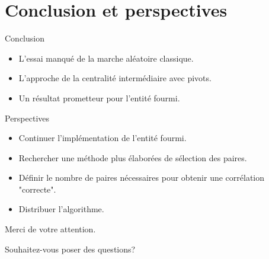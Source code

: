 \documentclass{beamer}
\begin{document}
\section{Conclusion et perspectives}

\begin{frame}
	\begin{block}{Conclusion}
		\begin{itemize}
		    \item L'essai manqué de la marche aléatoire classique.
		    \item L'approche de la centralité intermédiaire avec pivots.
		    \item Un résultat prometteur pour l'entité fourmi.
		\end{itemize}
	\end{block}
\end{frame}

\begin{frame}
	\begin{block}{Perspectives}
		\begin{itemize}
		    \item Continuer l'implémentation de l'entité fourmi.
		    \item Rechercher une méthode plus élaborées de sélection des paires.
		    \item Définir le nombre de paires nécessaires pour obtenir une corrélation "correcte".
		    \item Distribuer l'algorithme.
		\end{itemize}
	\end{block}
\end{frame}

\begin{frame}
     \begin{center}
         Merci de votre attention.
         
         Souhaitez-vous poser des questions?
     \end{center}
\end{frame}
\end{document}
